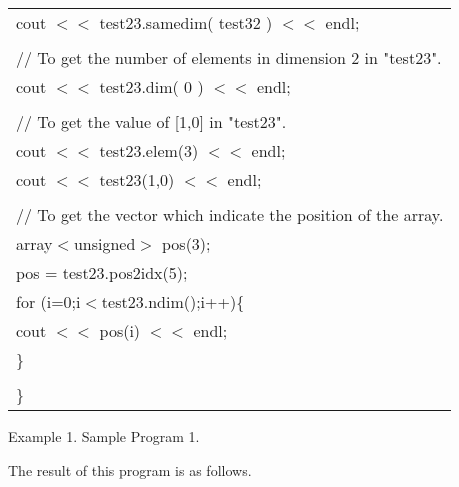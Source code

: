 {\begin{center}
\begin{tabular}{|l|}
\hspace*{10mm}cout $<<$ test23.samedim( test32 ) $<<$ endl; \\
\\
\hspace*{10mm}// To get the number of elements in dimension 2 in "test23".\\
\hspace*{10mm}cout $<<$ test23.dim( 0 ) $<<$ endl;\\
\\
\hspace*{10mm}// To get the value of [1,0] in "test23".\\
\hspace*{10mm}cout $<<$ test23.elem(3) $<<$ endl;\\
\hspace*{10mm}cout $<<$ test23(1,0) $<<$ endl;\\
\\
\hspace*{10mm}// To get the vector which indicate the position of the array.\\
\hspace*{10mm}array$<$unsigned$>$ pos(3);\\
\hspace*{10mm}pos = test23.pos2idx(5); \\
\hspace*{10mm}for (i=0;i$<$test23.ndim();i++)\{\\
\hspace*{20mm}cout $<<$ pos(i) $<<$ endl;\\
\hspace*{10mm}\}\\
\\
\}\\\hline
\end{tabular}
\vspace*{5mm}

Example 1. Sample Program 1.
\end{center}
}

\clearpage

\noindent
The result of this program is as follows.

